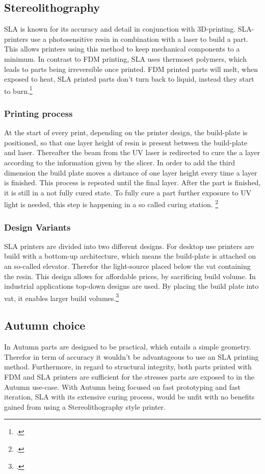 \subsection{Stereolithography}

SLA is known for its accuracy and detail in conjunction with 3D-printing. SLA-printers use a photosensitive resin in combination with a laser to build a part. This allows printers using this method to keep mechanical components to a minimum. In contrast to FDM printing, SLA uses thermoset polymers, which leads to parts being irreversible once printed. FDM printed parts will melt, when exposed to heat, SLA printed parts don't turn back to liquid, instead they start to burn.\footcite{hubsSLA3DPrintingNoDate}

\subsubsection{Printing process}

At the start of every print, depending on the printer design, the build-plate is positioned, so that one layer height of resin is present between the build-plate and laser. Thereafter the beam from the UV laser is redirected to cure the a layer according to the information given by the slicer. In order to add the third dimension the build plate moves a distance of one layer height every time a layer is finished. This process is repeated until the final layer.\newline
After the part is finished, it is still in a not fully cured state. To fully cure a part further exposure to UV light is needed, this step is happening in a so called curing station. \footcite{hubsSLA3DPrintingNoDate} 

\subsubsection{Design Variants}

SLA printers are divided into two different designs. For desktop use printers are build with a bottom-up architecture, which means the build-plate is attached on an so-called elevator. Therefor the light-source placed below the vat containing the resin. This design allows for affordable prices, by sacrificing build volume.\newline
In industrial applications top-down designs are used. By placing the build plate into vat, it enables larger build volumes.\footcite{hubsSLA3DPrintingNoDate}

\subsection{Autumn choice}

In Autumn parts are designed to be practical, which entails a simple geometry. Therefor in term of accuracy it wouldn't be advantageous to use an SLA printing method. Furthermore, in regard to structural integrity, both parts printed with FDM and SLA printers are sufficient for the stresses parts are exposed to in the Autumn use-case. With Autumn being focused on fast prototyping and fast iteration, SLA with its extensive curing process, would be unfit with no benefits gained from using a Stereolithography style printer. 

